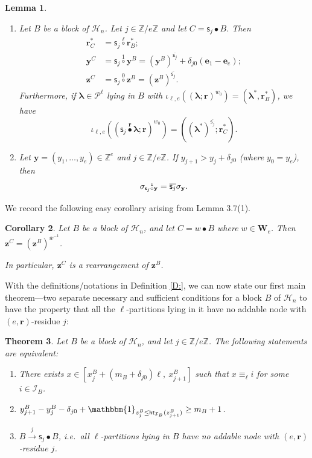 \documentclass[11pt,a4paper,reqno]{amsart}
\numberwithin{equation}{section}
\theoremstyle{plain}
\newtheorem{thm}{Theorem}[section]
\newtheorem{cor}[thm]{Corollary}
\newtheorem{lem}[thm]{Lemma}
\theoremstyle{definition}
\theoremstyle{remark}
\numberwithin{equation}{section}
\newcommand{\bbone}{\mathbbm{1}}
\newcommand{\bl}{\boldsymbol{\lambda}}
\newcommand{\br}{\mathbf{r}}
\newcommand{\by}{\mathbf{y}}
\newcommand{\bz}{\mathbf{z}}
\newcommand{\ZZ}{\mathbb{Z}}
\newcommand{\cs}{\mathsf{s}}
\newcommand{\HH}{\mathcal{H}}
\newcommand{\PP}{\mathcal{P}}
\newcommand{\Be}{\mathbf{e}}
\newcommand{\AW}{\mathbf{W}}
\newcommand{\DDot}[1]{\mathrel{\overset{#1}{\bullet}}}
\newcommand{\CDot}[1]{\mathrel{\overset{#1}{\circ}}}
\newcommand{\bij}{\iota}
\newcommand{\Ht}{\mathsf{ht}}
\newcommand{\II}{\mathcal{I}}
\begin{document}
\begin{lem} \label{L:cs_j} \hfill
\begin{enumerate}
\item \cite[Lemma 3.15(2), Lemma 4.7]{LQT}
Let $B$ be a block of $\HH_n$.  Let $j \in \ZZ/e\ZZ$ and let $C = \cs_j \DDot{} B$.
Then
\begin{align*}
\br^*_C &= \cs_j \CDot{\ell} \br^*_B; \\
\by^C & = \cs_j \CDot{1} \by^B = (\by^B)^{\overline{\cs_j}} + \delta_{j0}(\Be_1 - \Be_e); \\
\bz^C &= \cs_j \CDot{0} \bz^B = (\bz^B)^{\overline{\cs_j}}.
\end{align*}
Furthermore, if $\bl \in \PP^{\ell}$ lying in $B$ with $\bij_{\ell,e}((\bl;\br) ^{w_0}) = (\bl^*, \br^*_B)$, we have
$$\bij_{\ell,e}((\cs_j \DDot{\br} \bl; \br)^{w_0}) = ((\bl^*)^{\overline{\cs_j}}; \br^*_C).$$

\item \cite[Proposition 4.13(1)]{LQT} Let $\by= (y_1,\dotsc, y_e) \in \ZZ^e$ and $j \in \ZZ/e\ZZ$.
If $y_{j+1} > y_j + \delta_{j0}$ (where $y_0 = y_e$), then $$\sigma_{\cs_j \smash[t]{\CDot{1}} \by} = \overline{\cs_j}\sigma_{\by}.$$

\end{enumerate}
\end{lem}

We record the following easy corollary arising from Lemma 3.7(1).

\begin{cor} \label{C:w-z}
Let $B$ be a block of $\HH_n$, and let $C = w \DDot{} B$ where $w \in \AW_e$.
Then
$\bz^C = (\bz^B)^{\overline{w}^{-1}}$.

In particular, $\bz^C$ is a rearrangement of $\bz^B$.
\end{cor}


With the definitions/notations in Definition \ref{D:}, we can now state our first main theorem---two separate necessary and sufficient conditions for a block $B$ of $\HH_n$ to have the property that all the $\ell$-partitions lying in it have no addable node with $(e,\br)$-residue $j$:


\begin{thm} \label{T:equiv1}
Let $B$ be a block of $\HH_n$, and let 
$j \in \ZZ/e\ZZ$.  The following statements are equivalent:
\begin{enumerate}
\item There exists $x \in [x_j^B + (m_B + \delta_{j0})\ell,\ x^B_{j+1} ]$ such that $x \equiv_{\ell} i$ for some $i \in \II_B$.

\item $y^B_{j+1} - y^B_j - \delta_{j0} + \bbone_{z^B_j \leq \Ht_{\II_B}(z^B_{j+1})} \geq m_B+1$.

\item $B \xrightarrow{j} \cs_j \DDot{} B$, i.e.\
all $\ell$-partitions lying in $B$ have no addable node with $(e,\br)$-residue $j$.

\end{enumerate}
\end{thm}
\end{document}
